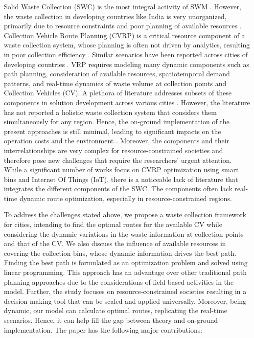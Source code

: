 \documentclass[12pt]{article}
\begin{document}
Solid Waste Collection (SWC) is the most integral activity of SWM \parencite*{GUPTA2015206}. However, the waste collection in developing countries like India is very unorganized, primarily due to resource constraints and poor planning of available resources \parencite{somani2021integrated}. Collection Vehicle Route Planning (CVRP) is a critical resource component of a waste collection system, whose planning is often not driven by analytics, resulting in poor collection efficiency  \parencite{akbarpour2021innovative}. Similar scenarios have been reported across cities of developing countries \parencite{anagnostopoulos2014effective, anagnostopoulos2015assessing, alwabli2020dynamic}. VRP requires modeling many dynamic components such as path planning, consideration of available resources, spatiotemporal demand patterns, and real-time dynamics of waste volume at collection points and Collection Vehicles (CV). A plethora of literature addresses subsets of these components in solution development across various cities \parencite{dugdhe2016efficient,chaudhari2018solid,badve2020garbage}. However, the literature has not reported a holistic waste collection system that considers them simultaneously for any region. Hence, the on-ground implementation of the present approaches is still minimal, leading to significant impacts on the operation costs and the environment \parencite{apaydin2007route, han2015waste}. Moreover, the components and their interrelationships are very complex for resource-constrained societies and therefore pose new challenges that require the researchers' urgent attention. While a significant number of works focus on CVRP optimization using smart bins and Internet Of Things (IoT), there is a noticeable lack of literature that integrates the different components of the SWC.  The components often lack real-time dynamic route optimization, especially in resource-constrained regions.

To address the challenges stated above, we propose a waste collection framework for cities, intending to find the optimal routes for the available CV while considering the dynamic variations in the waste information at collection points and that of the CV. We also discuss the influence of available resources in covering the collection bins, whose dynamic information drives the best path. Finding the best path is formulated as an optimization problem and solved using linear programming. This approach has an advantage over other traditional path planning approaches due to the considerations of field-based activities in the model. Further, the study focuses on resource-constrained societies resulting in a decision-making tool that can be scaled and applied universally.
Moreover, being dynamic, our model can calculate optimal routes, replicating the real-time scenarios. Hence, it can help fill the gap between theory and on-ground implementation. The paper has the following major contributions:
\end{document}
